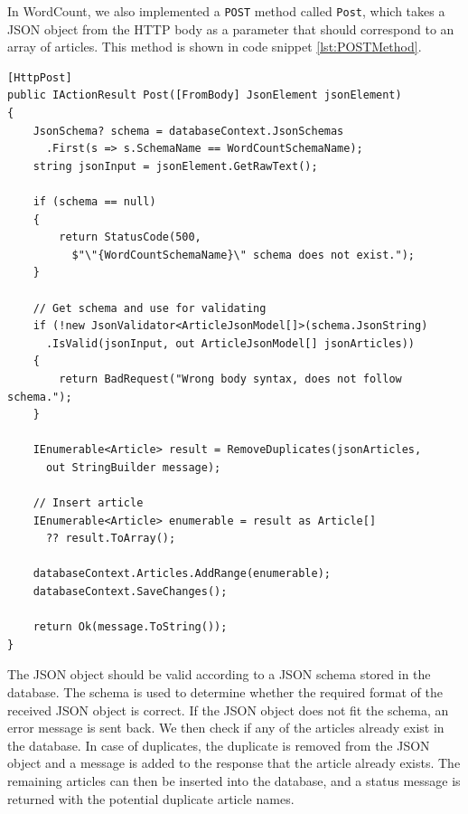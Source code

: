 In WordCount, we also implemented a \texttt{POST} method called \texttt{Post}, which takes a JSON object from the HTTP body as a parameter that should correspond to an array of articles. 
This method is shown in code snippet \ref{lst:POSTMethod}.

\begin{lstlisting}[language=CSharp, caption={The \texttt{POST} method.}, label={lst:POSTMethod}]
[HttpPost]
public IActionResult Post([FromBody] JsonElement jsonElement)
{
    JsonSchema? schema = databaseContext.JsonSchemas
      .First(s => s.SchemaName == WordCountSchemaName);
    string jsonInput = jsonElement.GetRawText();

    if (schema == null)
    {
        return StatusCode(500, 
          $"\"{WordCountSchemaName}\" schema does not exist.");
    }

    // Get schema and use for validating
    if (!new JsonValidator<ArticleJsonModel[]>(schema.JsonString)
      .IsValid(jsonInput, out ArticleJsonModel[] jsonArticles))
    {
        return BadRequest("Wrong body syntax, does not follow schema.");
    }

    IEnumerable<Article> result = RemoveDuplicates(jsonArticles,
      out StringBuilder message);

    // Insert article
    IEnumerable<Article> enumerable = result as Article[] 
      ?? result.ToArray();

    databaseContext.Articles.AddRange(enumerable);
    databaseContext.SaveChanges();

    return Ok(message.ToString());
}
\end{lstlisting}

The JSON object should be valid according to a JSON schema stored in the database. The schema is used to determine whether the required format of the received JSON object is correct. If the JSON object does not fit the schema, an error message is sent back. 
We then check if any of the articles already exist in the database.
In case of duplicates, the duplicate is removed from the JSON object and a message is added to the response that the article already exists. 
The remaining articles can then be inserted into the database, and a status message is returned with the potential duplicate article names. 
 
